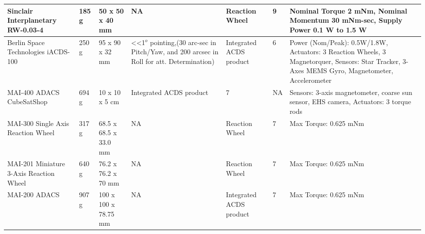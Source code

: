 \begin{center}
     \begin{tabular}{ | p{2cm} | p{1.25cm} | p{2cm} | p{2cm} | p{2cm} | p{1cm} | p{5cm} |}
	 \hline 
	   
Sinclair Interplanetary RW-0.03-4 \cite{Sinclair} & 185 g & 50 x 50 x 40 mm & NA & Reaction Wheel & 9 & Nominal Torque 2 mNm, Nominal Momentum 30 mNm-sec, Supply Power 0.1 W to 1.5 W \\ \hline
	   
Berlin Space Technologies iACDS-100 \cite{BST} & 250 g & 95 x 90 x 32 mm & <<1$^o$ pointing,(30 arc-sec in Pitch/Yaw, and 200 arcsec in Roll for att. Determination) & Integrated ACDS product & 6 & Power (Nom/Peak): 0.5W/1.8W, Actuators: 3 Reaction Wheels, 3 Magnetorquer, Sensors: Star Tracker, 3-Axes MEMS Gyro, Magnetometer, Accelerometer \\ \hline 
	   
MAI-400 ADACS CubeSatShop \cite{CubeShop} & 694 g & 10 x 10 x 5 cm	& Integrated ACDS product & 7 & NA & Sensors: 3-axis magnetometer, coarse sun sensor, EHS camera, Actuators: 3 torque rods  \\ \hline 
	   
MAI-300 Single Axis Reaction Wheel \cite{CubeShop} & 317 g & 68.5 x 68.5 x 33.0 mm & NA & Reaction Wheel & 7 & Max Torque: 0.625 mNm \\ \hline
	   
MAI-201 Miniature 3-Axis Reaction Wheel \cite{CubeShop} & 640 g & 76.2 x 76.2 x 70 mm & NA & Reaction Wheel & 7 & Max Torque: 0.625 mNm \\ \hline
	   
MAI-200 ADACS \cite{CubeShop} & 907 g & 100 x 100 x 78.75 mm & NA & Integrated ACDS product & 7 & Max Torque: 0.625 mNm \\ \hline
     \end{tabular}
\end{center}


